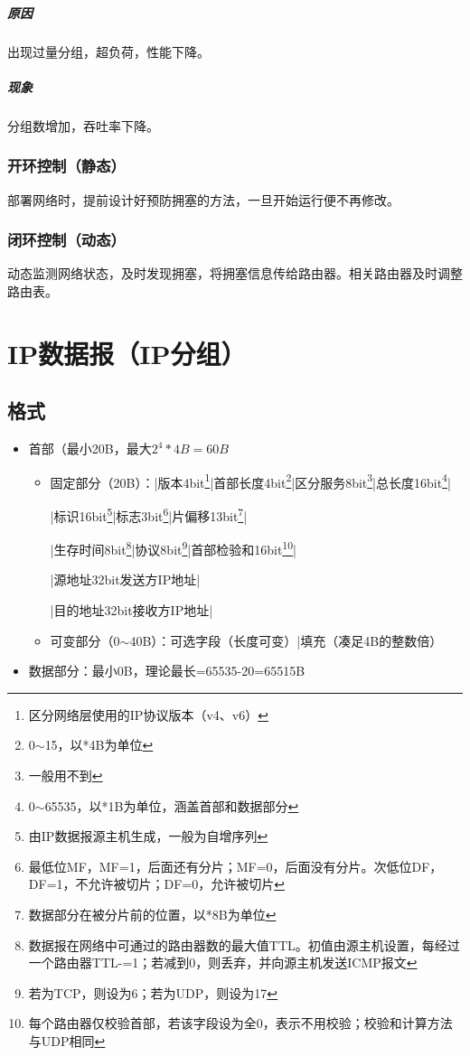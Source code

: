 \subparagraph{原因}
出现过量分组，超负荷，性能下降。


\subparagraph{现象}
分组数增加，吞吐率下降。


\subsubsection{开环控制（静态）}
部署网络时，提前设计好预防拥塞的方法，一旦开始运行便不再修改。


\subsubsection{闭环控制（动态）}
动态监测网络状态，及时发现拥塞，将拥塞信息传给路由器。相关路由器及时调整路由表。


\section{IP数据报（IP分组）}

\subsection{格式}
\begin{itemize}
    \item 首部（最小20B，最大\(2^4 * 4B = 60B\)\begin{itemize}
        \item 固定部分（20B）：|版本4bit\footnote{区分网络层使用的IP协议版本（v4、v6）}|首部长度4bit\footnote{0\(\sim\)15，以*4B为单位}|区分服务8bit\footnote{一般用不到}|总长度16bit\footnote{0\(\sim\)65535，以*1B为单位，涵盖首部和数据部分}|
        
        |标识16bit\footnote{由IP数据报源主机生成，一般为自增序列}|标志3bit\footnote{最低位MF，MF=1，后面还有分片；MF=0，后面没有分片。次低位DF，DF=1，不允许被切片；DF=0，允许被切片}|片偏移13bit\footnote{数据部分在被分片前的位置，以*8B为单位}|
        
        |生存时间8bit\footnote{数据报在网络中可通过的路由器数的最大值TTL。初值由源主机设置，每经过一个路由器TTL-=1；若减到0，则丢弃，并向源主机发送ICMP报文}|协议8bit\footnote{若为TCP，则设为6；若为UDP，则设为17}|首部检验和16bit\footnote{每个路由器仅校验首部，若该字段设为全0，表示不用校验；校验和计算方法与UDP相同}|
        
        |源地址32bit发送方IP地址|
        
        |目的地址32bit接收方IP地址|
        
        \item 可变部分（0\(\sim\)40B）：可选字段（长度可变）|填充（凑足4B的整数倍）
    \end{itemize}
    \item 数据部分：最小0B，理论最长=65535-20=65515B
\end{itemize}


